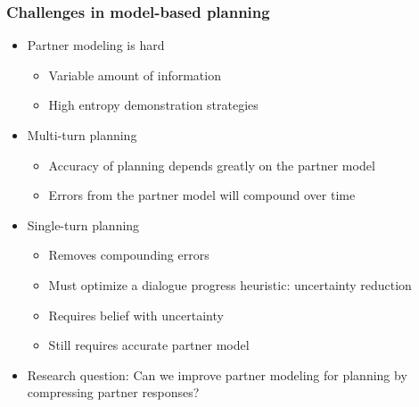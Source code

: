 \documentclass{beamer}
\begin{document}
\begin{frame}
\frametitle{Challenges in model-based planning}
\begin{itemize}
\item Partner modeling is hard
    \begin{itemize}
    \item Variable amount of information
    \item High entropy demonstration strategies
    \end{itemize}
\item Multi-turn planning
    \begin{itemize}
    \item Accuracy of planning depends greatly on the partner model
    \item Errors from the partner model will compound over time
    \end{itemize}
\item Single-turn planning
    \begin{itemize}
    \item Removes compounding errors
    \item Must optimize a dialogue progress heuristic: uncertainty reduction
    \item Requires belief with uncertainty
    \item Still requires accurate partner model
    \end{itemize}
\item Research question: Can we improve partner modeling for planning
    by compressing partner responses?
\end{itemize}
\end{frame}
\end{document}
